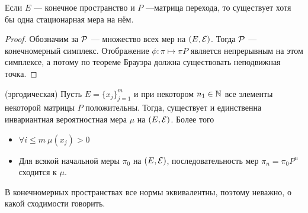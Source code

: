 \begin{theorem}
	Если $E$ --- конечное пространство и $P$ ---матрица перехода, то существует хотя бы одна стационарная мера на нём.
\end{theorem}

\begin{proof}
	Обозначим за $\mathcal{P}$ --- множество всех мер на $(E, \mathcal{E})$. Тогда $\mathcal{P}$ --- конечномерный симплекс. Отображение $\phi \colon \pi \mapsto \pi P$ является непрерывным на этом симплексе, а потому по теореме Брауэра должна существовать неподвижная точка.
\end{proof}

\begin{theorem} (эргодическая)
	Пусть $E = \{x_j\}_{j = 1}^m$ и при некотором $n_1 \in \mathbb{N}$ все элементы некоторой матрицы $P$ положительны. Тогда, существует и единственна инвариантная вероятностная мера $\mu$ на $(E, \mathcal{E})$. Более того\begin{itemize}
		\item $\forall i \le m\ \mu(x_j) > 0$
		
		\item Для всякой начальной меры $\pi_0$ на $(E, \mathcal{E})$, последовательность мер $\pi_n = \pi_0 P^n$ сходится к $\mu$.
	\end{itemize}
\end{theorem}

\begin{note}
	В конечномерных пространствах все нормы эквивалентны, поэтому неважно, о какой сходимости говорить.
\end{note}

